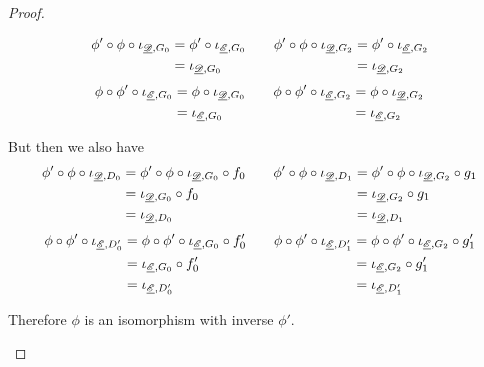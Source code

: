 \begin{proof}
\begin{enumerate}
\[\begin{split}\phi'\circ \phi \circ \iota_{\underline{\mathscr{D}}, G_0}&=\phi'\circ \iota_{\underline{\mathscr{E}}, G_0} \\&=\iota_{\underline{\mathscr{D}}, G_0} \end{split} \qquad \begin{split}\phi'\circ \phi\circ \iota_{\underline{\mathscr{D}}, G_2}&=\phi'\circ \iota_{\underline{\mathscr{E}}, G_2}\\&=\iota_{\underline{\mathscr{D}}, G_2} \end{split}   \]
\[\begin{split}\phi\circ \phi' \circ \iota_{\underline{\mathscr{E}}, G_0}&=\phi\circ \iota_{\underline{\mathscr{D}}, G_0} \\&=\iota_{\underline{\mathscr{E}}, G_0} \end{split} \qquad \begin{split}\phi\circ \phi'\circ \iota_{\underline{\mathscr{E}}, G_2}&=\phi \circ \iota_{\underline{\mathscr{D}}, G_2}\\&=\iota_{\underline{\mathscr{E}}, G_2} \end{split}   \]

But then we also have
\[
\begin{split} \phi'\circ \phi\circ \iota_{\underline{\mathscr{D}}, D_0}&=\phi'\circ \phi \circ \iota_{\underline{\mathscr{D}}, G_0}\circ f_0\\&=\iota_{\underline{\mathscr{D}}, G_0}\circ f_0\\&=\iota_{\underline{\mathscr{D}}, D_0}\end{split} \qquad 
\begin{split} \phi'\circ \phi\circ \iota_{\underline{\mathscr{D}}, D_1}&=\phi'\circ \phi \circ \iota_{\underline{\mathscr{D}}, G_2}\circ g_1\\&=\iota_{\underline{\mathscr{D}}, G_2}\circ g_1\\&=\iota_{\underline{\mathscr{D}}, D_1}\end{split} \]
\[
\begin{split} \phi\circ \phi'\circ \iota_{\underline{\mathscr{E}}, D'_0}&=\phi\circ \phi' \circ \iota_{\underline{\mathscr{E}}, G_0}\circ f'_0\\&=\iota_{\underline{\mathscr{E}}, G_0}\circ f'_0\\&=\iota_{\underline{\mathscr{E}}, D'_0}\end{split} \qquad 
\begin{split} \phi\circ \phi'\circ \iota_{\underline{\mathscr{E}}, D'_1}&=\phi\circ \phi' \circ \iota_{\underline{\mathscr{E}}, G_2}\circ g'_1\\&=\iota_{\underline{\mathscr{E}}, G_2}\circ g'_1\\&=\iota_{\underline{\mathscr{E}}, D'_1}\end{split} \]
	
		Therefore $\phi$ is an isomorphism with inverse $\phi'$. 
		

\end{enumerate}
\end{proof}
